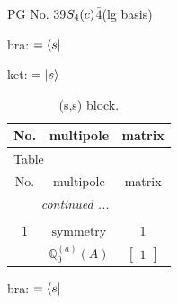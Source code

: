 \documentclass[fleqn,8pt,landscape]{jsarticle}
\begin{document}
\setcounter{MaxMatrixCols}{32}

\renewcommand{\tablename}{Table~}
\renewcommand{\figurename}{Figure~}
\begin{center}
\LARGE
PG No. 39\quad$S_{\rm 4}(c)$\quad$\bar{4}$\quad[ tetragonal ] (lg basis)
\end{center}
bra: $=\bra{s}$

\noindent
ket: $=\ket{s}$
\renewcommand{\arraystretch}{1.6}
\begin{longtable}{ccc}
\caption{(s,s) block.}
 \\
 \hline \hline
No. & multipole & matrix \\ \hline \endfirsthead

\multicolumn{2}{l}{\tablename\ \thetable{}} \\
 \hline \hline
No. & multipole & matrix \\ \hline \endhead

 \hline \hline
\multicolumn{2}{r}{\footnotesize\it continued ...} \\ \endfoot

 \hline \hline
\multicolumn{2}{r}{} \\ \endlastfoot

$ 1 $ & $ \text{symmetry} $ & $ 1 $ \\
$  $ & $ \mathbb{Q}_{0}^{(a)}(A) $ & $ \begin{bmatrix} 1 \end{bmatrix} $ \\ \hline
\end{longtable}
bra: $=\bra{s}$
\end{document}
